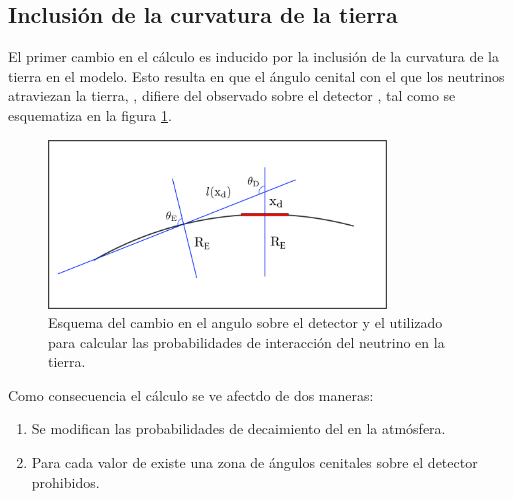 	\subsection{Inclusi\'on de la curvatura de la tierra}
	El primer cambio en el c\'alculo es inducido por la inclusi\'on de la curvatura de la tierra en el modelo. 
	Esto resulta en que el \'angulo cenital con el que los neutrinos atraviezan la tierra, \te{}, difiere del observado sobre el detector \td{}, tal como se esquematiza en la figura \ref{fig:curveEarthSketch0}.
	 \begin{figure}[ht!]
		\centering
		\includegraphics[width=0.8\textwidth]{./fig/appendix/curveEarthSketch.pdf}
		\caption{\label{fig:curveEarthSketch0}
		Esquema del cambio en el angulo sobre el detector y el utilizado para calcular las probabilidades de interacci\'on del neutrino en la tierra.
		}
	\end{figure}
	Como consecuencia el c\'alculo se ve afectdo de dos maneras:
	\begin{enumerate}
	 \item Se modifican las probabilidades de decaimiento del \tauon{} en la atm\'osfera.
	 \item Para cada valor de \xd{} existe una zona de \'angulos cenitales sobre el detector prohibidos.
	\end{enumerate}
	
